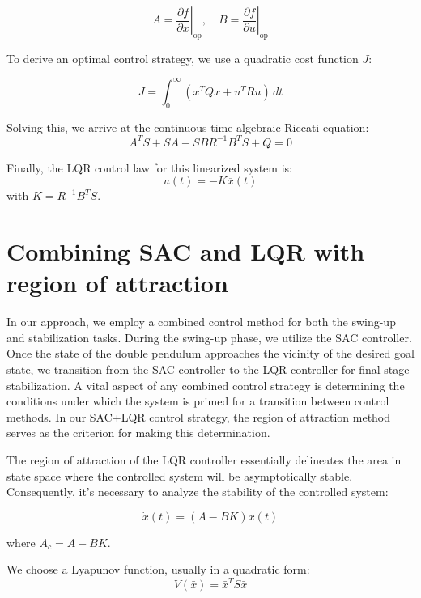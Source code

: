 \begin{equation}
 A = \left.\frac{\partial f}{\partial x}\right|_{\text{op}}, \quad B = \left.\frac{\partial f}{\partial u}\right|_{\text{op}}
\end{equation}


To derive an optimal control strategy, we use a quadratic cost function \(J\):

\begin{equation}
  J = \int_0^{\infty} \left( x^T Q x + u^T R u \right) \, dt
\end{equation}

Solving this, we arrive at the continuous-time algebraic Riccati equation:
\begin{equation}
 A^T S + SA - SBR^{-1}B^T S + Q = 0
\end{equation}

Finally, the LQR control law for this linearized system is:
\begin{equation}
 u(t) = -K\overline{x}(t)
\end{equation}
with \(K = R^{-1}B^T S\).


\section{Combining SAC and LQR with region of attraction}
In our approach, we employ a combined control method for both the swing-up and stabilization tasks. During the swing-up phase, we utilize the SAC controller. Once the state of the double pendulum approaches the vicinity of the desired goal state, we transition from the SAC controller to the LQR controller for final-stage stabilization. A vital aspect of any combined control strategy is determining the conditions under which the system is primed for a transition between control methods. In our SAC+LQR control strategy, the region of attraction method serves as the criterion for making this determination.

The region of attraction of the LQR controller essentially delineates the area in state space where the controlled system will be asymptotically stable. Consequently, it's necessary to analyze the stability of the controlled system:

\begin{equation}
\dot{x}(t) = (A - BK)x(t)
\end{equation}

where \(A_c = A - BK\).

We choose a Lyapunov function, usually in a quadratic form:
\begin{equation}
  V(\bar{x}) = \bar{x}^T S \bar{x} 
\end{equation}

